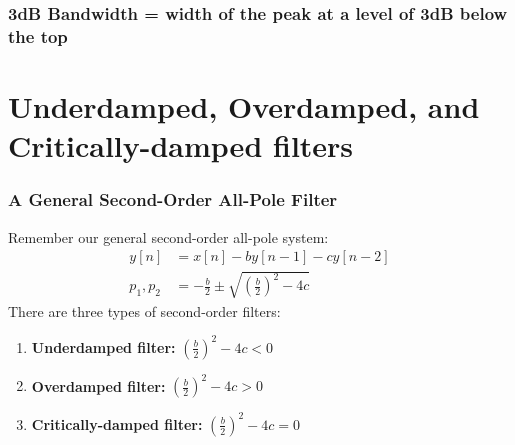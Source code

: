 \documentclass{beamer}
\begin{document}
\begin{frame}
  \frametitle{3dB Bandwidth = width of the peak at a level of 3dB below the top}
  \centerline{}
\end{frame}

\section[Underdamped/Overdamped]{Underdamped, Overdamped, and Critically-damped filters}
\setcounter{subsection}{1}

\begin{frame}
  \frametitle{A General Second-Order All-Pole Filter}

  Remember our general second-order all-pole system:
  \begin{align*}
    y[n] &= x[n]-by[n-1]-cy[n-2]\\
    p_1,p_2 &= -\frac{b}{2}\pm\sqrt{\left(\frac{b}{2}\right)^2-4c}
  \end{align*}
  There are three types of second-order filters:
  \begin{enumerate}
  \item \textbf{Underdamped filter:} $\left(\frac{b}{2}\right)^2-4c<0$
  \item \textbf{Overdamped filter:}  $\left(\frac{b}{2}\right)^2-4c>0$
  \item \textbf{Critically-damped filter:}  $\left(\frac{b}{2}\right)^2-4c=0$
  \end{enumerate}
\end{frame}
\end{document}
